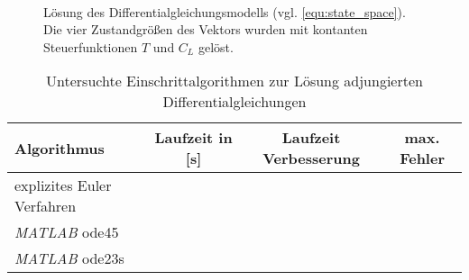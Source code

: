 \begin{figure}[!htbp]
    \centering 
    \qquad
     \\

    \qquad
    \caption{Lösung des Differentialgleichungsmodells (vgl. \eqref{equ:state_space}). Die vier Zustandgrößen des Vektors wurden mit kontanten Steuerfunktionen \(T\) und \(C_L\) gelöst.} %
\end{figure}


\begin{table}[htbp]
    \caption{Untersuchte Einschrittalgorithmen zur Lösung adjungierten Differentialgleichungen}
    \begin{tabularx}{\textwidth}{Xccc}
        \toprule
        \textbf{Algorithmus} & \textbf{Laufzeit in [s]} & \textbf{Laufzeit Verbesserung} & \textbf{max. Fehler} \\
        \midrule
        explizites Euler Verfahren &&&\\
        \textit{MATLAB} ode45 &&&\\
        \textit{MATLAB} ode23s &&&\\
        \bottomrule
    \end{tabularx}
\end{table}

